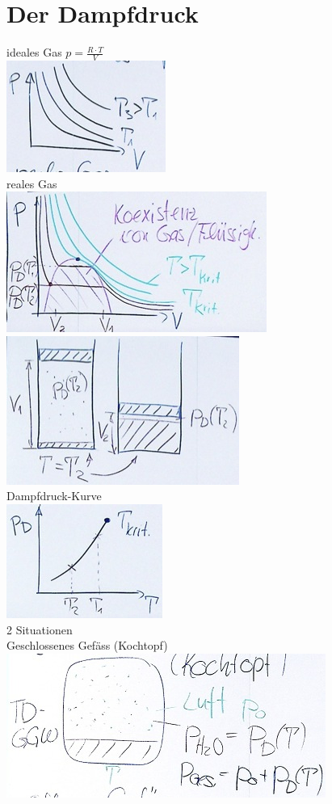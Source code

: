\section{Der Dampfdruck}
ideales Gas $p = \frac{R \cdot T}{V}$ \\
\includegraphics{Bild133} \\
reales Gas \\
\includegraphics{Bild134} \\
\includegraphics{Bild135} \\
Dampfdruck-Kurve \\
\includegraphics{Bild136} \\
2 Situationen \\
Geschlossenes Gefäss (Kochtopf) \\
\includegraphics{Bild137} \\
